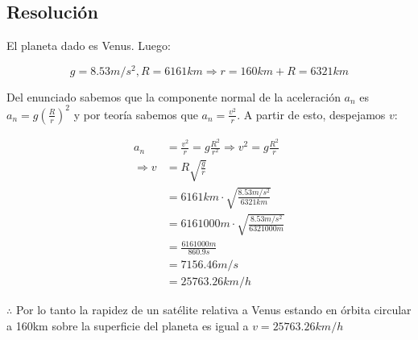 \documentclass[11pt]{article}
\begin{document}
\subsection*{Resolución}

El planeta dado es Venus. Luego:

\begin{equation*}
  g = 8.53m/s^2, R = 6161km \Rightarrow r=160km + R = 6321km
\end{equation*}

Del enunciado sabemos que la componente normal de la aceleración $a_n$ es
$a_n = g{(\frac{R}{r})}^2$ y por teoría sabemos que $a_n = \frac{v^2}{r}$.
A partir de esto, despejamos $v$:

\begin{align*}
  a_n &= \frac{v^2}{r} = g \frac{R^2}{r^2} \Rightarrow v^2 = g \frac{R^2}{r} \\
  \Rightarrow v &= R\sqrt{\frac{g}{r}} \\
  &= 6161km \cdot \sqrt{\frac{8.53m/s^2}{6321km}} \\
  &= 6161000m \cdot \sqrt{\frac{8.53m/s^2}{6321000m}} \\
  &= \frac{6161000m}{860.9s} \\
  &= 7156.46 m/s \\
  &= 25763.26km/h
\end{align*}

$\therefore$ Por lo tanto la rapidez de un satélite relativa a Venus estando
en órbita circular a 160km sobre la superficie del planeta es igual a 
$v = 25763.26km/h$
\end{document}
